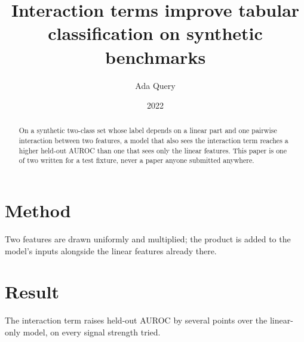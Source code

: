 \documentclass{article}
\title{Interaction terms improve tabular classification on synthetic benchmarks}
\author{Ada Query}
\date{2022}
\begin{document}
\maketitle
\begin{abstract}
On a synthetic two-class set whose label depends on a linear part and one pairwise interaction
between two features, a model that also sees the interaction term reaches a higher held-out AUROC
than one that sees only the linear features. This paper is one of two written for a test fixture,
never a paper anyone submitted anywhere.
\end{abstract}
\section{Method}
Two features are drawn uniformly and multiplied; the product is added to the model's inputs
alongside the linear features already there.
\section{Result}
The interaction term raises held-out AUROC by several points over the linear-only model, on every
signal strength tried.
\end{document}
